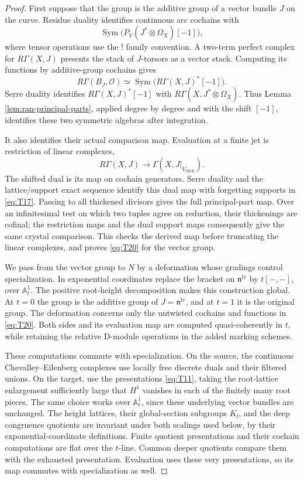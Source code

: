 \documentclass[11pt]{article}
\numberwithin{equation}{section}
\theoremstyle{definition}
\theoremstyle{remark}
\begin{document}
\begin{proof}
First suppose that the group is the additive group of a vector bundle
$J$ on the curve.  Residue duality identifies continuous arc cochains
with
\[
 \operatorname{Sym}\bigl(P_V(J^*\otimes\Omega_X)[-1]\bigr),
\]
where tensor operations use the ! family convention.  A two-term perfect
complex for $R\Gamma(X,J)$ presents the stack of $J$-torsors as a vector
stack.  Computing its functions by additive-group cochains gives
\[
 R\Gamma(B_J,\mathcal O)
   \simeq\operatorname{Sym}\bigl(R\Gamma(X,J)^*[-1]\bigr).
\]
Serre duality identifies $R\Gamma(X,J)^*[-1]$ with
$R\Gamma(X,J^*\otimes\Omega_X)$.  Thus Lemma
\ref{lem:ran-principal-parts}, applied degree by degree and with the
shift $[-1]$, identifies these two symmetric algebras after integration.

It also identifies their actual comparison map.  Evaluation at a finite
jet is restriction of linear complexes,
\[
 R\Gamma(X,J)\longrightarrow\Gamma(X,J|_{V_{\mathrm{thick}}}).
\]
The shifted dual is its map on cochain generators.  Serre duality and
the lattice/support exact sequence identify this dual map with forgetting
supports in \eqref{eq:T17}.  Passing to all thickened divisors gives the
full principal-part map.  Over an infinitesimal test on which two tuples
agree on reduction, their thickenings are cofinal; the restriction maps
and the dual support maps consequently give the same crystal comparison.
This checks the derived map before truncating the linear complexes, and
proves \eqref{eq:T20} for the vector group.

We pass from the vector group to $N$ by a deformation whose gradings
control specialization.  In exponential coordinates replace the bracket
on $\mathfrak n^{\mathrm{lv}}$ by $t[-,-]$, over $\mathbb A^1_t$.
The positive root-height decomposition makes this construction global.
At $t=0$ the group is the additive group of
$J=\mathfrak n^{\mathrm{lv}}$, and at $t=1$ it is the original group.
The deformation concerns only the untwisted cochains and functions in
\eqref{eq:T20}.  Both sides and its evaluation map are computed
quasi-coherently in $t$, while retaining the relative D-module operations
in the added marking schemes.

These computations commute with specialization.  On the source, the
continuous Chevalley--Eilenberg complexes use locally free discrete duals
and their filtered unions.  On the target, use the presentations
\eqref{eq:T11}, taking the root-lattice enlargement sufficiently large
that $H^1$ vanishes in each of the finitely many root pieces.  The same
choice works over $\mathbb A^1_t$, since these underlying vector bundles
are unchanged.  The height lattices, their global-section subgroups
$K_l$, and the deep congruence quotients are invariant under both scalings
used below, by their exponential-coordinate definitions.  Finite quotient
presentations and their cochain computations are flat over the $t$-line.  Common deeper quotients compare
them with the exhausted presentation.  Evaluation uses these very
presentations, so its map commutes with specialization as well.


\end{proof}
\end{document}
